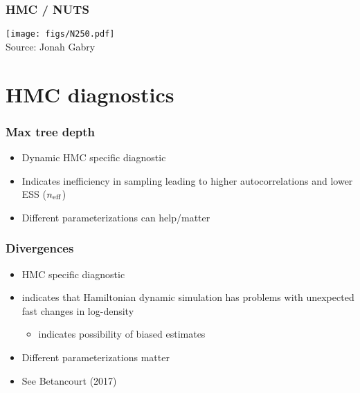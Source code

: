 \documentclass[10pt]{beamer}
\begin{document}
\begin{frame}

\frametitle{HMC / NUTS}

  \vspace{-.5\baselineskip}
  \texttt{[image: figs/N250.pdf]}\\
  Source: Jonah Gabry

\end{frame}

\section{HMC diagnostics}
\frame{\sectionpage}

\begin{frame}

\frametitle{Max tree depth}

  \begin{itemize}
  \item Dynamic HMC specific diagnostic
  \item Indicates inefficiency in sampling leading to higher
    autocorrelations and lower ESS ($n_{\rm eff}$)
  \item Different parameterizations can help/matter
  \end{itemize}
\end{frame}


\begin{frame}
\frametitle{Divergences}

  \begin{itemize}
  \item HMC specific diagnostic
  \item indicates that Hamiltonian dynamic simulation
    has problems with unexpected fast changes in log-density
  \begin{itemize}
  \item indicates possibility of biased estimates
  \end{itemize}
  \item Different parameterizations matter
  \item See Betancourt (2017)
  \end{itemize}
\end{frame}
\end{document}
